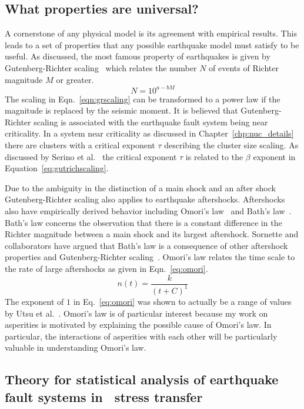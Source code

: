 \subsection{What properties are universal?}
A cornerstone of any physical model is its agreement with empirical results. This leads to a set of properties that any possible earthquake model must satisfy to be  useful. As discussed, the most famous property  of earthquakes is given by Gutenberg-Richter scaling~\cite{gr56} which relates the number $N$ of events of Richter magnitude $M$ or greater. %
\begin{equation}
 \label{eqn:grscaling}
	N = 10^{a-bM}
\end{equation} %
The scaling in Eqn.~\eqref{eqn:grscaling} can be transformed to a power law if the magnitude is replaced by the seismic moment. It is believed that Gutenberg-Richter scaling is associated with the earthquake fault system being near criticality. In a system near criticality as discussed in Chapter~\ref{chp:nuc_details} there are  clusters with a critical exponent $\tau$ describing the cluster size scaling. As discussed by Serino et al.~\cite{serinoth} the critical exponent $\tau$ is related to the $\beta$ exponent in Equation~\eqref{eq:gutrichscaling}.


Due to the ambiguity in the distinction of a main shock and an after shock Gutenberg-Richter scaling also applies to earthquake aftershocks. Aftershocks also have empirically derived behavior including Omori's law~\cite{omori94} and Bath's law~\cite{bath65}. Bath's law concerns the observation that there is a constant difference in the Richter magnitude between a main shock and its largest aftershock. Sornette and collaborators have argued that Bath's law is a consequence of other aftershock properties and Gutenberg-Richter scaling~\cite{sornette03}. Omori's law relates the time scale to the rate of large aftershocks as given in Eqn.~\eqref{eq:omori}. %
\begin{equation}
 \label{eq:omori}
	n(t) = \frac{k}{(t+C)^1}
\end{equation} %
The exponent of $1$ in Eq.~\eqref{eq:omori} was shown to actually be a range of values by  Utsu et al.~\cite{utsu95}. Omori's law is of particular interest because  my work on asperities is motivated by explaining the possible cause of Omori's law. In particular, the interactions of asperities with each other will be particularly valuable in understanding Omori's law.


\subsection{ Theory for statistical analysis of earthquake fault systems in \lr\ stress transfer }

